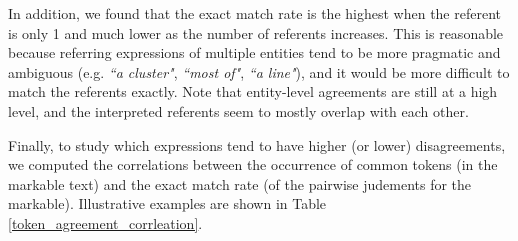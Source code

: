 In addition, we found that the exact match rate is the highest when the referent is only 1 and much lower as the number of referents increases. This is reasonable because referring expressions of multiple entities tend to be more pragmatic and ambiguous (e.g. \textit{``a cluster"}, \textit{``most of"}, \textit{``a line"}), and it would be more difficult to match the referents exactly. Note that entity-level agreements are still at a high level, and the interpreted referents seem to mostly overlap with each other.

Finally, to study which expressions tend to have higher (or lower) disagreements, we computed the correlations between the occurrence of common tokens (in the markable text) and the exact match rate (of the pairwise judements for the markable). Illustrative examples are shown in Table \ref{token_agreement_corrleation}.

